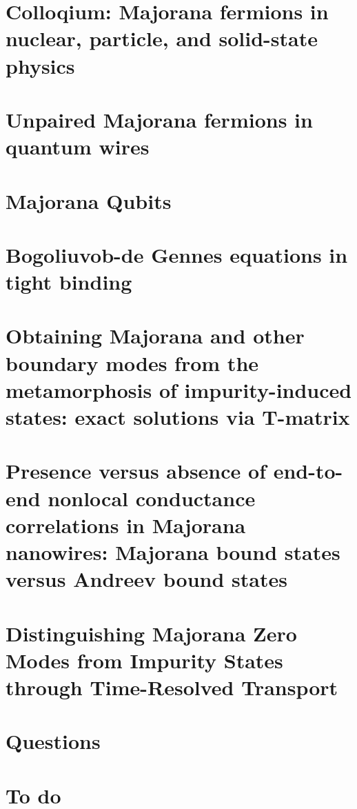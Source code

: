\documentclass[11pt,twoside,a4paper]{article} %
\begin{document}
\newpage
\section{Colloqium: Majorana fermions in nuclear, particle, and solid-state physics}


\newpage
\section{Unpaired Majorana fermions in quantum wires}


\newpage
\section{Majorana Qubits}


\newpage
\section{Bogoliuvob-de Gennes equations in tight binding}


\newpage
\section{Obtaining Majorana and other boundary modes from the metamorphosis of impurity-induced states:  exact solutions via T-matrix}


\newpage
\section{Presence versus absence of end-to-end nonlocal conductance correlations in Majorana nanowires: Majorana bound states versus Andreev bound states}


\newpage
\section{Distinguishing Majorana Zero Modes from Impurity States through Time-Resolved Transport}


\newpage


\section{Questions}


\newpage
\section{To do}

\end{document}
